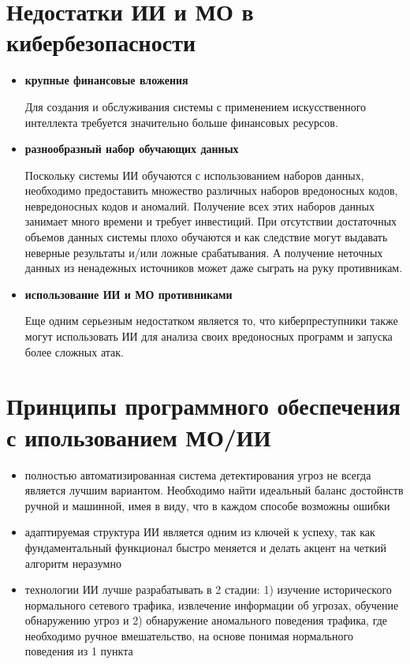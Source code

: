 \documentclass{article}
\begin{document}
\section*{Недостатки ИИ и МО в кибербезопасности}
\begin{itemize}
    \item \textbf{крупные финансовые вложения}
    
Для создания и обслуживания системы с применением искусственного интеллекта требуется значительно больше финансовых ресурсов.
    \item \textbf{разнообразный набор обучающих данных}
    
Поскольку системы ИИ обучаются с использованием наборов данных, необходимо предоставить множество различных наборов вредоносных кодов, невредоносных кодов и аномалий. Получение всех этих наборов данных занимает много времени и требует инвестиций.
При отсутствии достаточных объемов данных системы плохо обучаются и как следствие могут выдавать неверные результаты и/или ложные срабатывания. А получение неточных данных из ненадежных источников может даже сыграть на руку противникам.
    \item \textbf{использование ИИ и МО противниками}
    
Еще одним серьезным недостатком является то, что киберпреступники также могут использовать ИИ для анализа своих вредоносных программ и запуска более сложных атак.

\end{itemize}

\section*{Принципы программного обеспечения с ипользованием МО/ИИ}
\begin{itemize}
    \item полностью автоматизированная система детектирования угроз не всегда является лучшим вариантом. Необходимо найти идеальный баланс достойнств ручной и машинной, имея в виду, что в каждом способе возможны ошибки
    \item адаптируемая структура ИИ является одним из ключей к успеху, так как фундаментальный функционал быстро меняется и делать акцент на четкий алгоритм неразумно
    \item технологии ИИ лучше разрабатывать в 2 стадии: 1) изучение исторического нормального сетевого трафика, извлечение информации об угрозах, обучение обнаружению угроз и 2) обнаружение аномального поведения трафика, где необходимо ручное вмешательство, на основе понимая нормального поведения из 1 пункта

\end{itemize}
\end{document}
